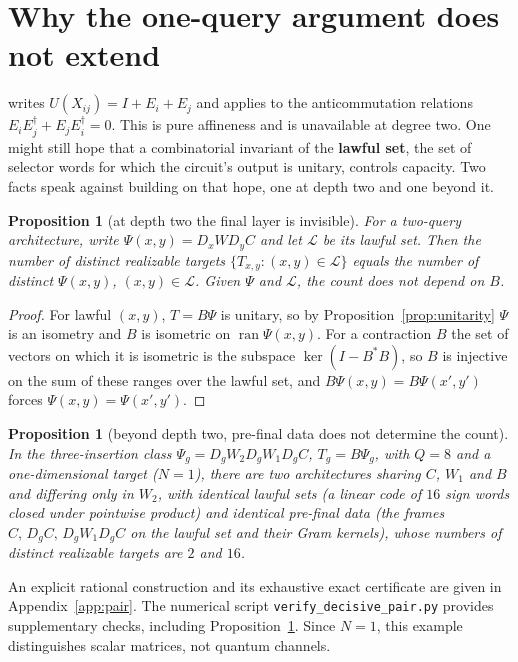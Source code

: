 \documentclass[11pt,a4paper]{article}
\theoremstyle{plain}
\newtheorem{proposition}[theorem]{Proposition}
\theoremstyle{definition}
\theoremstyle{remark}
\DeclareMathOperator{\ran}{ran}
\newcommand{\Lawful}{\mathcal L}
\begin{document}
\section{Why the one-query argument does not extend}\label{sec:onequery}

\cite[Thm~6.7]{AK07} writes $U(X_{ij})=I+E_i+E_j$ and applies \cite[Lem.~6.6]{AK07} to the
anticommutation relations $E_iE_j^{\dagger}+E_jE_i^{\dagger}=0$. This is pure affineness and
is unavailable at degree two. One might still hope that a combinatorial invariant of the
\textbf{lawful set}, the set of selector words for which the circuit's output is unitary,
controls capacity. Two facts speak against building on that hope, one at depth two and one
beyond it.

\begin{proposition}[at depth two the final layer is invisible]\label{prop:invisible}
For a two-query architecture, write $\Psi(x,y)=D_xWD_yC$ and let $\Lawful$ be its lawful set.
Then the number of distinct realizable targets $\{T_{x,y}:(x,y)\in\Lawful\}$ equals the number
of distinct $\Psi(x,y)$, $(x,y)\in\Lawful$. Given $\Psi$ and $\Lawful$, the count does not
depend on $B$.
\end{proposition}

\begin{proof}
For lawful $(x,y)$, $T=B\Psi$ is unitary, so by Proposition~\ref{prop:unitarity} $\Psi$ is an
isometry and $B$ is isometric on $\ran\Psi(x,y)$. For a contraction $B$ the set of vectors on
which it is isometric is the subspace $\ker(I-B^{*}B)$, so $B$ is injective on the sum of
these ranges over the lawful set, and $B\Psi(x,y)=B\Psi(x',y')$ forces
$\Psi(x,y)=\Psi(x',y')$.
\end{proof}

\begin{proposition}[beyond depth two, pre-final data does not determine the count]\label{prop:pair}
In the three-insertion class $\Psi_g=D_gW_2D_gW_1D_gC$, $T_g=B\Psi_g$, with $Q=8$ and a
one-dimensional target ($N=1$), there are two architectures sharing $C$, $W_1$ and $B$ and
differing only in $W_2$, with identical lawful sets (a linear code of $16$ sign words closed
under pointwise product) and identical pre-final data (the frames $C,\,D_gC,\,D_gW_1D_gC$ on
the lawful set and their Gram kernels), whose numbers of distinct realizable targets are $2$
and $16$.
\end{proposition}

An explicit rational construction and its exhaustive exact certificate are given in
Appendix~\ref{app:pair}. The numerical script \texttt{verify\_decisive\_pair.py}
provides supplementary checks, including Proposition~\ref{prop:invisible}.
Since $N=1$, this example distinguishes scalar matrices, not quantum channels.
\end{document}
